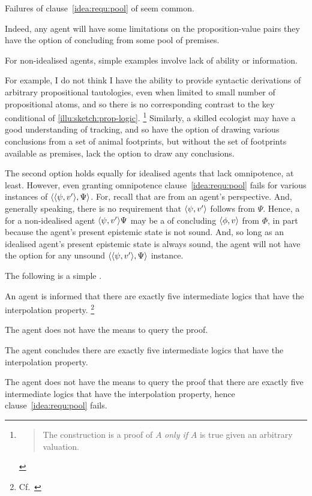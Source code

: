\begin{note}
  Failures of clause~\ref{idea:requ:pool} of \iRequ{} seem common.

  Indeed, any agent will have some limitations on the proposition-value pairs they have the option of concluding from some pool of premises.

  For non-idealised agents, simple examples involve lack of ability or information.

  For example, I do not think I have the ability to provide syntactic derivations of arbitrary propositional tautologies, even when limited to small number of propositional atoms, and so there is no corresponding contrast to the key conditional of \autoref{illu:sketch:prop-logic}.%
  \footnote{
    \begin{quote}
      The construction is a proof of \(A\) \emph{only if} \(A\) is true given an arbitrary valuation.
    \end{quote}
  }
  Similarly, a skilled ecologist may have a good understanding of tracking, and so have the option of drawing various conclusions from a set of animal footprints, but without the set of footprints available as premises, lack the option to draw any conclusions.

  The second option holds equally for idealised agents that lack omnipotence, at least.
  However, even granting omnipotence clause~\ref{idea:requ:pool} fails for various instances of \(\langle \langle \psi, v' \rangle, \Psi \rangle\).
  For, recall that  are from an agent's perspective.
  And, generally speaking, there is no requirement that \(\langle \psi, v' \rangle\) follows from \(\Psi\).
  Hence, a for a non-idealised agent \(\langle \psi, v' \rangle{\Psi}\) may be a \requ{} of concluding \(\langle \phi, v \rangle\) from \(\Phi\), in part because the agent's present epistemic state is not sound.
  And, so long as an idealised agent's present epistemic state is always sound, the agent will not have the option for any unsound \(\langle \langle \psi, v' \rangle, \Psi \rangle\) instance.
\end{note}

\begin{note}
  The following is a simple .

  \begin{illustration}
    \label{illu:testimony-layperson}
    An agent is informed that there are exactly five intermediate logics that have the interpolation property.\nolinebreak
  \footnote{Cf.\ \textcite{Maksimova:1977un}}

    The agent does not have the means to query the proof.

    The agent concludes there are exactly five intermediate logics that have the interpolation property.
  \end{illustration}

  The agent does not have the means to query the proof that there are exactly five intermediate logics that have the interpolation property, hence clause~\ref{idea:requ:pool} fails.
\end{note}

